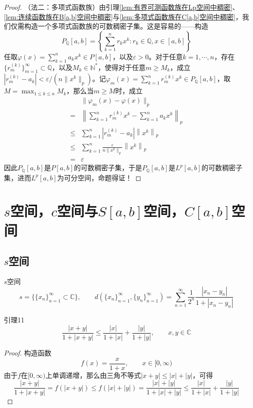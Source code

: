 \documentclass[lang = cn, scheme = chinese, thmcnt = section]{elegantbook}
\newcommand{\C}{\mathbb{C}}  		   %
\newcommand{\sub}{\subset}             %
\begin{document}
\begin{proof}
	（法二：多项式函数族）由引理\ref{lem:有界可测函数族在Lp空间中稠密}、\ref{lem:连续函数族在B[a,b]空间中稠密}与\ref{lem:多项式函数族在C[a,b]空间中稠密}，我们仅需构造一个多项式函数族的可数稠密子集。这是容易的——构造
	$$
	P_{\mathbb{Q}}[a,b]=\left\{ \sum_{k=1}^{n}r_k x^k:r_k\in\mathbb{Q},x\in[a,b] \right\}
	$$
	任取$\displaystyle \varphi(x)=\sum_{k=1}^{n}a_k x^k \in P[a,b]$，以及$\varepsilon>0$。对于任意$k=1,\cdots,n$，存在$\{ r_m^{(k)} \}_{m=1}^{\infty}\subset\mathbb{Q}$，以及$M_k\in\mathbb{N}^*$，使得对于任意$m\ge M_k$，成立$|r_m^{(k)}-a_k|<\varepsilon/(n\|x^k\|_p)$。记$\displaystyle \varphi_m(x)=\sum_{k=1}^{n}r_m^{(k)} x^k \in P_{\mathbb{Q}}[a,b]$，取$\displaystyle M=\max_{1\le k \le n}M_k$，那么当$m\ge M$时，成立
	\begin{align*}
		&\| \varphi_m(x)-\varphi(x) \|_p\\
		=&\left\|  \sum_{k=1}^{n}r_m^{(k)} x^k-\sum_{k=1}^{n}a_k x^k \right\|_p\\
		\le&\sum_{k=1}^{n} |r_m^{(k)}-a_k|\left\|  x^k \right\|_p\\
		\le& \sum_{k=1}^{n}\frac{\varepsilon}{n\|x^k\|_p}\left\|  x^k \right\|_p\\
		=&\varepsilon
	\end{align*}
	因此$P_\mathbb{Q}[a,b]$是$P[a,b]$的可数稠密子集，于是$P_\mathbb{Q}[a,b]$是$L^p[a,b]$的可数稠密子集，进而$L^p[a,b]$为可分空间，命题得证！
\end{proof}

\section{$s$空间，$c$空间与$S[a,b]$空间，$C[a,b]$空间}

\subsection{$s$空间}

\begin{definition}{$s$空间}
	$$
	s=\{\{x_n\}_{n=1}^{\infty}\sub\C\},\qquad 
	d(\{x_n\}_{n=1}^{\infty},\{y_n\}_{n=1}^{\infty})=\sum_{n=1}^{\infty}\frac{1}{2^n}\frac{|x_n-y_n|}{1+|x_n-y_n|}
	$$
\end{definition}

\begin{lemma}{}{引理11}
	$$
	\frac{|x+y|}{1+|x+y|}\le\frac{|x|}{1+|x|}+\frac{|y|}{1+|y|},\qquad x,y\in\C
	$$
\end{lemma}

\begin{proof}
	构造函数
	$$
	f(x)=\frac{x}{1+x},\qquad x\in[0,\infty)
	$$
	由于$f$在$[0,\infty)$上单调递增，那么由三角不等式$|x+y|\le |x|+|y|$，可得
	$$
	\frac{|x+y|}{1+|x+y|}
	= f(|x+y|)
	\le f(|x|+|y|)
	= \frac{|x|+|y|}{1+|x|+|y|}
	\le \frac{|x|}{1+|x|}+\frac{|y|}{1+|y|}
	$$
\end{proof}
\end{document}
